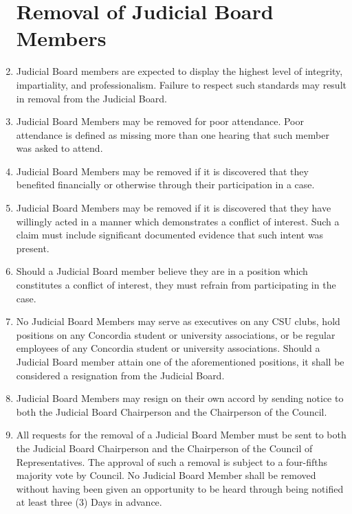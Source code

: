 \documentclass[oneside]{book}
\begin{document}
\begin{enumerate}
\section{\label{JB_removal}Removal of Judicial Board Members}
\item Judicial Board members are expected to display the highest level of integrity,
impartiality, and professionalism. Failure to respect such standards may result in removal
from the Judicial Board.
\item Judicial Board Members may be removed for poor attendance. Poor attendance is
defined as missing more than one hearing that such member was asked to attend. 
\item Judicial Board Members may be removed if it is discovered that they benefited
financially or otherwise through their participation in a case.
\item Judicial Board Members may be removed if it is discovered that they have willingly
acted in a manner which demonstrates a conflict of interest. Such a claim must include
significant documented evidence that such intent was present. 
\item Should a Judicial Board member believe they are in a position which constitutes a 
conflict of interest, they must refrain from participating in the case.
\item No Judicial Board Members may serve as executives on any CSU clubs, hold positions
on any Concordia student or university associations, or be regular employees of any
Concordia student or university associations. Should a Judicial Board member attain one of
the aforementioned positions, it shall be considered a resignation from the Judicial Board.
\item Judicial Board Members may resign on their own accord by sending notice to both the
Judicial Board Chairperson and the Chairperson of the Council.
\item All requests for the removal of a Judicial Board Member must be sent to both the
Judicial Board Chairperson and the Chairperson of the Council of Representatives. The
approval of such a removal is subject to a four-fifths majority vote by Council. No Judicial
Board Member shall be removed without having been given an opportunity to be heard
through being notified at least three (3) Days in advance.


\end{enumerate}
\end{document}
